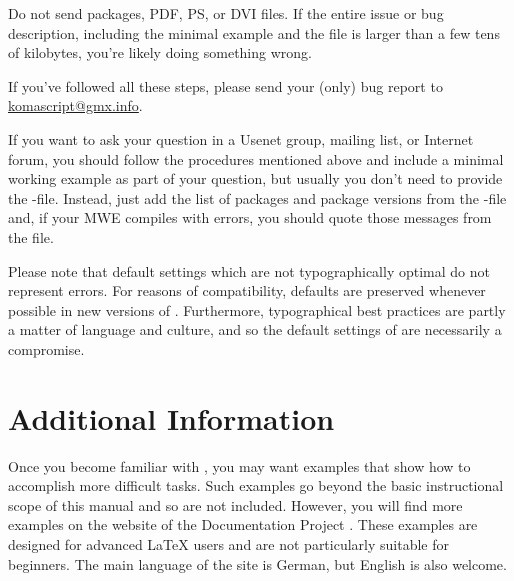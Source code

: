Do not send packages, PDF, PS, or DVI files. If the entire issue or bug
description, including the minimal example and the  file is larger
than a few tens of kilobytes, you're likely doing something wrong.

If you've followed all these steps, please send your {\KOMAScript} (only) bug
report to \href{mailto:komascript@gmx.info}{komascript@gmx.info}.

If you want to ask your question in a Usenet group, mailing list, or Internet
forum, you should follow the procedures mentioned above and include a minimal
working example as part of your question, but usually you don't need to
provide the -file. Instead, just add the list of packages and
package versions from the -file and, if your MWE compiles with
errors, you should quote those messages from the  file.

Please note that default settings which are not typographically optimal do not
represent errors. For reasons of compatibility, defaults are preserved
whenever possible in new versions of {\KOMAScript}. Furthermore, typographical
best practices are partly a matter of language and culture, and so the default
settings of {\KOMAScript} are necessarily a compromise.

\section{Additional Information}

Once you become familiar with {\KOMAScript}, you may want examples that show
how to accomplish more difficult tasks. Such examples go beyond the basic
instructional scope of this manual and so are not included. However, you will
find more examples on the website of the {\KOMAScript} Documentation Project
\cite{homepage}. These examples are designed for advanced {\LaTeX} users and
are not particularly suitable for beginners. The main language of the site
is German, but English is also welcome.

\endinput

